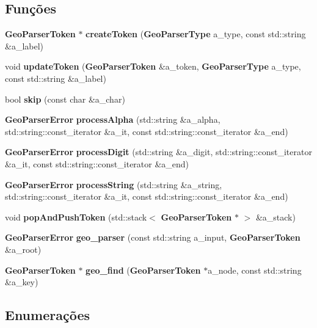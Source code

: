 \subsection*{Funções}
\begin{DoxyCompactItemize}
\item 
{\bf Geo\+Parser\+Token} $\ast$ {\bf create\+Token} ({\bf Geo\+Parser\+Type} a\+\_\+type, const std\+::string \&a\+\_\+label)
\item 
void {\bf update\+Token} ({\bf Geo\+Parser\+Token} \&a\+\_\+token, {\bf Geo\+Parser\+Type} a\+\_\+type, const std\+::string \&a\+\_\+label)
\item 
bool {\bf skip} (const char \&a\+\_\+char)
\item 
{\bf Geo\+Parser\+Error} {\bf process\+Alpha} (std\+::string \&a\+\_\+alpha, std\+::string\+::const\+\_\+iterator \&a\+\_\+it, const std\+::string\+::const\+\_\+iterator \&a\+\_\+end)
\item 
{\bf Geo\+Parser\+Error} {\bf process\+Digit} (std\+::string \&a\+\_\+digit, std\+::string\+::const\+\_\+iterator \&a\+\_\+it, const std\+::string\+::const\+\_\+iterator \&a\+\_\+end)
\item 
{\bf Geo\+Parser\+Error} {\bf process\+String} (std\+::string \&a\+\_\+string, std\+::string\+::const\+\_\+iterator \&a\+\_\+it, const std\+::string\+::const\+\_\+iterator \&a\+\_\+end)
\item 
void {\bf pop\+And\+Push\+Token} (std\+::stack$<$ {\bf Geo\+Parser\+Token} $\ast$ $>$ \&a\+\_\+stack)
\item 
{\bf Geo\+Parser\+Error} {\bf geo\+\_\+parser} (const std\+::string a\+\_\+input, {\bf Geo\+Parser\+Token} \&a\+\_\+root)
\item 
{\bf Geo\+Parser\+Token} $\ast$ {\bf geo\+\_\+find} ({\bf Geo\+Parser\+Token} $\ast$a\+\_\+node, const std\+::string \&a\+\_\+key)
\end{DoxyCompactItemize}


\subsection{Enumerações}
